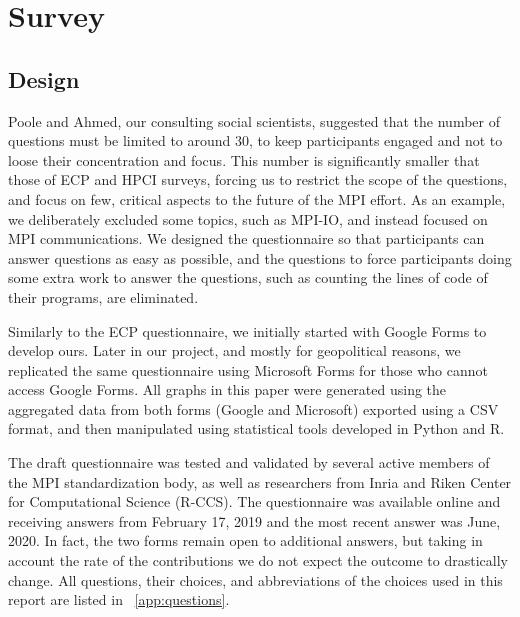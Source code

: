 \documentclass[preprint,5p,times]{elsarticle}
\newcommand{\revision}[2]{{\color{blue}#2}}
\begin{document}
\section{Survey}

\subsection*{Design}
%
\revision{The social scientists}{Poole and Ahmed, our consulting social
scientists,} suggested that the number of questions must be
limited \revision{}{to}
around 30, to keep participants engaged and not to loose their concentration and
focus. This number is significantly smaller that those of ECP and HPCI surveys,
forcing us to restrict the scope of the questions, and focus on few, critical
aspects to the future of the MPI effort. As an example, we deliberately excluded
some topics, such as MPI-IO, and instead focused on MPI communications.
We designed the questionnaire so that participants can answer questions
as easy as possible, and the questions to force participants doing
some extra work to answer the questions, such as counting the lines of
code of their programs, are eliminated.

Similarly to the ECP questionnaire, we initially started with Google Forms to
develop ours. Later in our project, and mostly for geopolitical reasons, we
replicated the same questionnaire using Microsoft Forms for those who cannot
access Google Forms. All graphs in this paper were generated using the
aggregated data from both forms (Google and Microsoft) exported using a \revision{CVS}{CSV}
format, and then manipulated using statistical tools developed in Python and R.

The draft questionnaire was tested and validated by several active members of
the MPI standardization body, as well as researchers from Inria and Riken Center
for Computational Science (R-CCS).
The questionnaire was available online and receiving answers from February
17, 2019 \revision{until recently}{and the most recent answer was June, 2020}. In fact, the two forms remain open to additional
answers, but taking in account the rate of the contributions we do not expect
the outcome to drastically change.
All questions, their choices, and abbreviations of the choices used in
this report are listed in ~\ref{app:questions}.
\end{document}

